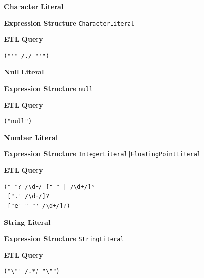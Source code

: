 \begin{chapterBody}
\noindent\textbf{Character Literal}
\vspace{1em}

\begin{minipage}[t]{.45\linewidth}
\textbf{Expression Structure} \hfill\break
\texttt{CharacterLiteral}
\end{minipage}
\begin{minipage}[t]{.45\linewidth}
\textbf{ETL Query}
\begin{lstlisting}[language=etl]
("'" /./ "'")
\end{lstlisting}
\end{minipage}

\noindent\textbf{Null Literal}
\vspace{1em}

\begin{minipage}[t]{.45\linewidth}
\textbf{Expression Structure} \hfill\break
\texttt{{\color{bp-blue}null}}
\end{minipage}
\begin{minipage}[t]{.45\linewidth}
\textbf{ETL Query}
\begin{lstlisting}[language=etl]
("null")
\end{lstlisting}
\end{minipage}

\noindent\textbf{Number Literal}
\vspace{1em}

\begin{minipage}[t]{.45\linewidth}
\textbf{Expression Structure} \hfill\break
\texttt{IntegerLiteral|FloatingPointLiteral}
\end{minipage}
\begin{minipage}[t]{.45\linewidth}
\textbf{ETL Query}
\begin{lstlisting}[language=etl]
("-"? /\d+/ ["_" | /\d+/]*
 ["." /\d+/]?
 ["e" "-"? /\d+/]?)
\end{lstlisting}
\end{minipage}

\noindent\textbf{String Literal}
\vspace{1em}

\begin{minipage}[t]{.45\linewidth}
\textbf{Expression Structure} \hfill\break
\texttt{StringLiteral}
\end{minipage}
\begin{minipage}[t]{.45\linewidth}
\textbf{ETL Query}
\begin{lstlisting}[language=etl]
("\"" /.*/ "\"")
\end{lstlisting}
\end{minipage}


\end{chapterBody}
